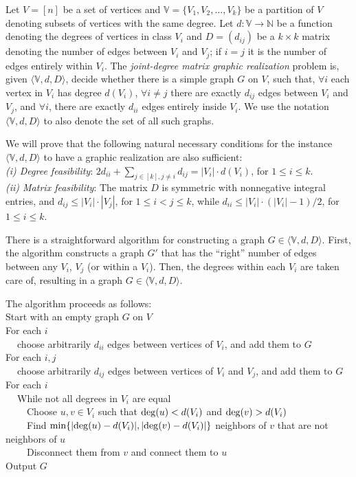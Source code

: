 \documentclass[12pt,a4paper]{article}
\theoremstyle{definition}
\theoremstyle{plain}
\begin{document}
Let $V \! = \! [n]$ be a set of vertices and 
${\mathbb V} \! = \! \{ V_1 , V_2 , \ldots , V_k \}$
be a partition of $V$ denoting
subsets of vertices with the same degree. Let $d:\mathbb V \rightarrow {\mathbb N}$
be a function denoting the degrees
of vertices in class $V_i$ and $D \! = \! (d_{ij})$ be a $k\times k$ matrix
denoting the number of edges between $V_i$ and $V_j$;
if $i\! = \! j$ it is the number of edges entirely within $V_i$.
The {\it joint-degree matrix graphic realization} problem is,
given $\langle{\mathbb V},d,D\rangle$, decide
whether there is a simple graph $G$ on $V$, such that,
$\forall i$ each vertex in $V_i$ has degree $d(V_i)$,
$\forall i \neq j$ there are exactly $d_{ij}$ edges between $V_i$ and $V_j$,
and $\forall i$, there are exactly $d_{ii}$ edges entirely inside $V_i$.
We use the notation $\langle{\mathbb V},d,D\rangle$
to also denote the set of all such graphs.

We will prove that the following natural
necessary conditions for the instance $\langle{\mathbb V},d,D\rangle$
to have a graphic realization are also sufficient:\smallskip\\
{\it (i) Degree feasibility}:
$2d_{ii} \! + \! \sum_{j \in [k],j\neq i} d_{ij} =
|V_i| \cdot d(V_i)$, for $ 1 \leq i \leq k$. \smallskip\\
{\it (ii) Matrix feasibility}:
The matrix $D$ is symmetric with nonnegative integral entries,
and
$d_{ij} \leq |V_i|\cdot|V_j|$, for $ 1 \leq i < j \leq k$,
while
$d_{ii} \leq |V_i|\cdot(|V_i|\! - \! 1)/2$, for $ 1 \leq i \leq k$.\smallskip

There is a straightforward algorithm for constructing a graph 
$G \in \langle{\mathbb V},d,D\rangle$. First, the algorithm
constructs a graph $G'$ that has the ``right'' number of edges
between any $V_i$, $V_j$ (or within a $V_i$). Then, the degrees 
within each $V_i$ are taken care of, resulting in a graph
$G \in \langle{\mathbb V},d,D\rangle$.

The algorithm proceeds as follows:\medskip\\
Start with an empty graph $G$ on $V$\\
For each $i$\\ $~~~~$ choose arbitrarily $d_{ii}$ edges between
vertices of $V_i$, and add them to $G$\\
For each $i,j$\\ $~~~~$ choose arbitrarily $d_{ij}$ edges between
vertices of $V_i$ and $V_j$, and add them to $G$\\
For each $i$\\ 
$~~~~$ While not all degrees in $V_i$ are equal\\
$~~~~$ $~~~$ Choose $u,v \in V_i$ such that ${\rm deg}(u)< d(V_i)$
and ${\rm deg}(v)> d(V_i)$\\
$~~~~$ $~~~$ Find $\min \{|{\rm deg}(u)-d(V_i)|,|{\rm deg}(v)-d(V_i)|\}$ 
neighbors of $v$ that are not neighbors of $u$\\
$~~~~$ $~~~$ Disconnect them from $v$ and connect them to $u$\\
Output $G$\medskip
\end{document}
